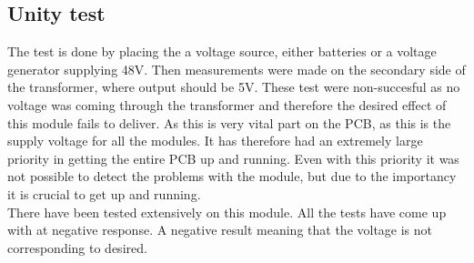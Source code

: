 \subsection{Unity test}
The test is done by placing the a voltage source, either batteries or a voltage generator supplying 48V. Then measurements were made on the secondary side of the transformer, where output should be 5V. These test were non-succesful as no voltage was coming through the transformer and therefore the desired effect of this module fails to deliver. As this is very vital part on the PCB, as this is the supply voltage for all the modules. It has therefore had an extremely large priority in getting the entire PCB up and running. Even with this priority it was not possible to detect the problems with the module, but due to the importancy it is crucial to get up and running.  \\
There have been tested extensively on this module. All the tests have come up with at negative response. A negative result meaning that the voltage is not corresponding to desired. 

